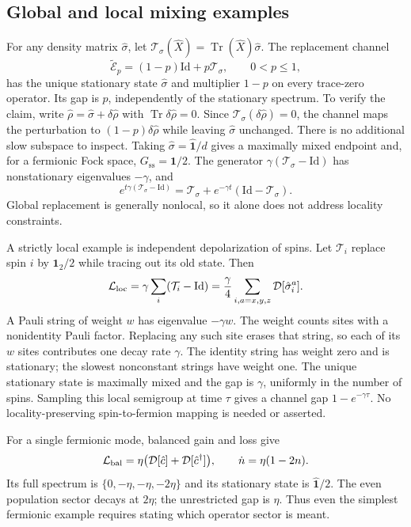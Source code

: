 \documentclass[aps,prb,onecolumn,nofootinbib,superscriptaddress,floatfix]{revtex4-2}
\newcommand{\Id}{\hat{\mathbf 1}}
\newcommand{\id}{\mathbf 1}
\newcommand{\Tr}{\operatorname{Tr}}
\newcommand{\E}{\widetilde{\mathcal E}}
\newcommand{\D}{\mathcal D}
\newcommand{\steady}{\mathrm{ss}}
\begin{document}
\subsection{Global and local mixing examples}
For any density matrix $\hat\sigma$, let
$\mathcal T_\sigma(\hat X)=\Tr(\hat X)\hat\sigma$.
The replacement channel
\begin{equation}
 \E_p=(1-p)\mathrm{Id}+p\mathcal T_\sigma,\qquad 0<p\le1,
 \label{eq:replace}
\end{equation}
has the unique stationary state $\hat\sigma$ and multiplier $1-p$
on every trace-zero operator. Its gap is $p$, independently of the
stationary spectrum. To verify the claim, write
$\hat\rho=\hat\sigma+\delta\hat\rho$ with
$\Tr\delta\hat\rho=0$. Since
$\mathcal T_\sigma(\delta\hat\rho)=0$, the channel maps the
perturbation to $(1-p)\delta\hat\rho$ while leaving $\hat\sigma$
unchanged. There is no additional slow subspace to inspect.
Taking $\hat\sigma=\Id/d$ gives a maximally
mixed endpoint and, for a fermionic Fock space, $G_\steady=\id/2$.
The generator $\gamma(\mathcal T_\sigma-\mathrm{Id})$ has nonstationary
eigenvalues $-\gamma$, and
\begin{equation}
 e^{t\gamma(\mathcal T_\sigma-\mathrm{Id})}
   =\mathcal T_\sigma+e^{-\gamma t}
           (\mathrm{Id}-\mathcal T_\sigma). \label{eq:replace_semigroup}
\end{equation}
Global replacement is generally nonlocal, so it alone does not
address locality constraints.

A strictly local example is independent depolarization of spins.
Let $\mathcal T_i$ replace spin $i$ by $\id_2/2$ while tracing out
its old state. Then
\begin{equation}
 \mathcal L_{\rm loc}=\gamma\sum_i(\mathcal T_i-\mathrm{Id})
   =\frac{\gamma}{4}\sum_{i,a=x,y,z}\D[\hat\sigma_i^a].
 \label{eq:local_depol}
\end{equation}
A Pauli string of weight $w$ has eigenvalue $-\gamma w$.
The weight counts sites with a nonidentity Pauli factor.
Replacing any such site erases that string, so each of its $w$
sites contributes one decay rate $\gamma$. The identity string
has weight zero and is stationary; the slowest nonconstant strings
have weight one.
The unique stationary state is maximally mixed and the gap is
$\gamma$, uniformly in the number of spins. Sampling this local
semigroup at time $\tau$ gives a channel gap $1-e^{-\gamma\tau}$.
No locality-preserving spin-to-fermion mapping is needed or asserted.

For a single fermionic mode, balanced gain and loss give
\begin{equation}
 \mathcal L_{\rm bal}=\eta\bigl(\D[\hat c]+\D[\hat c^\dagger]\bigr),
 \qquad \dot n=\eta(1-2n). \label{eq:balanced}
\end{equation}
Its full spectrum is $\{0,-\eta,-\eta,-2\eta\}$ and its stationary
state is $\Id/2$. The even population sector decays at $2\eta$;
the unrestricted gap is $\eta$. Thus even the simplest fermionic
example requires stating which operator sector is meant.
\end{document}
